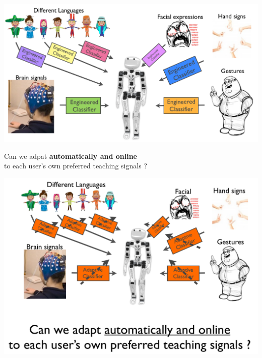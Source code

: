 \documentclass[a0,final, portrait]{inriaposter}
\begin{document}
\begin{multicols}{2}
{\begin{minipage}{.07\columnwidth}
\begin{center}
	\end{center}
\end{minipage}
\begin{minipage}{.45\columnwidth}
	\begin{center}
		\includegraphics[width=\columnwidth]{images/problem.png}
	\end{center}
\end{minipage}

\vspace{2cm}
\huge{Can we adpat \textbf{automatically and online} \\ to each user's own preferred teaching signals ? \vspace{2cm}}

\includegraphics[width=\columnwidth, trim=0cm 8cm 0cm 0cm, clip=true]{images/question.png}
}


\end{multicols}
\end{document}

